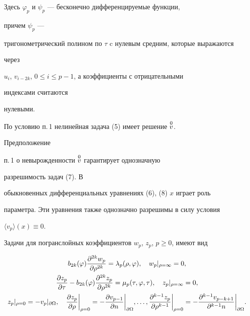 Здесь $\varphi_p$ и $\psi_p$ --- бесконечно дифференцируемые функции, 


причем $\psi_p$ --- 


тригонометрический полином по $\tau$ c нулевым средним, которые выражаются 


через  


$u_i$, $v_{i-2k}$, $0\le i\le p-1$, а коэффициенты с отрицательными 


индексами считаются 


нулевыми. 


 


По условию п.\,1 нелинейная задача (5) имеет решение $\overset{0}{v}{}$. 


Предположение 


п.\,1 о невырожденности $\overset{0}{v}{}$ гарантирует однозначную 


разрешимость задач (7). В 


обыкновенных дифференциальных уравнениях (6), (8) $x$ играет роль 


параметра. Эти уравнения также однозначно разрешимы в силу условия 


$\langle v_p\rangle(x)\equiv0$. 


 


Задачи для погранслойных коэффициентов $w_p$, $z_p$, $p\ge0$, имеют вид 


\begin{gather} 


b_{2k}(\varphi)\frac{\partial^{2k}w_p}{\partial\rho^{2k}}= 


\lambda_p(\rho,\varphi),\quad w_p|_{\rho=\infty}=0,\\ 


% 


\frac{\partial z_p}{\partial\tau}-b_{2k}(\varphi) 


\frac{\partial^{2k}z_p}{\partial\rho^{2k}}= 


\mu_p(\tau,\varphi,\tau),\quad z_p|_{\rho=\infty}=0,\\ 


% 


z_p|_{\rho=0}=-v_p|_{\partial\Omega},\quad 


\frac{\partial z_p}{\partial\rho}\bigg|_{\rho=0}= 


-\frac{\partial v_{p-1}}{\partial n}\bigg|_{\partial\Omega},\dotsc, 


\frac{\partial^{k-1}z_p}{\partial\rho^{k-1}}\bigg|_{\rho=0}= 


-\frac{\partial^{k-1}v_{p-k+1}}{\partial^{k-1}n} 


\bigg|_{\partial\Omega}.\notag 


\end{gather} 


